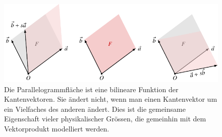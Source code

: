%
%
%
\begin{figure}
\centering
\includegraphics{chapters/040-green/images/parallelogramm.pdf}
\caption{Die Parallelogrammfläche ist eine bilineare Funktion der
Kantenvektoren.
Sie ändert nicht, wenn man einen Kantenvektor
um ein Vielfaches des anderen ändert.
Dies ist die gemeinsame Eigenschaft vieler physikalischer Grössen,
die gemeinhin mit dem Vektorprodukt modelliert werden.
\label{buch:green:2vektoren:fig:parallelogramm}}
\end{figure}
